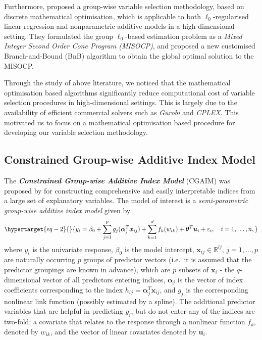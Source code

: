 \documentclass[11pt,a4paper,]{article}
\begin{document}
Furthermore, \textcite{Hazimeh2023} proposed a group-wise variable
selection methodology, based on discrete mathematical optimisation,
which is applicable to both \(\ell_{0}\)-regularised linear regression
and nonparametric additive models in a high-dimensional setting. They
formulated the group \(\ell_{0}\)-based estimation problem as a
\emph{Mixed Integer Second Order Cone Program (MISOCP)}, and proposed a
new customised Branch-and-Bound (BnB) algorithm
\autocite{Land1960,Little1963} to obtain the global optimal solution to
the MISOCP.

Through the study of above literature, we noticed that the mathematical
optimisation based algorithms significantly reduce computational cost of
variable selection procedures in high-dimensional settings. This is
largely due to the availability of efficient commercial solvers such as
\emph{Gurobi} and \emph{CPLEX}. This motivated us to focus on a
mathematical optimisation based procedure for developing our variable
selection methodology.

\hypertarget{sec-CGAIM}{%
\subsection{Constrained Group-wise Additive Index
Model}\label{sec-CGAIM}}

The \textbf{\emph{Constrained Group-wise Additive Index Model}} (CGAIM)
was proposed by \textcite{Masselot2022} for constructing comprehensive
and easily interpretable indices from a large set of explanatory
variables. The model of interest is a \emph{semi-parametric group-wise
additive index model} given by
\begin{equation}\protect\hypertarget{eq-2}{}{
  y_{i} = \beta_{0} + \sum_{j = 1}^{p}g_{j}(\bm{\alpha}_{j}^{T}\bm{x}_{ij}) + \sum_{k = 1}^{d}f_{k}(w_{ik}) + \bm{\theta}^{T}\bm{u}_{i} + \varepsilon_{i}, \quad i = 1, \dots, n,
}\label{eq-2}\end{equation} where \(y_{i}\) is the univariate response,
\(\beta_{0}\) is the model intercept,
\(\bm{x}_{ij} \in \mathbb{R}^{l{j}}\), \(j = 1, \dots, p\) are naturally
occurring \(p\) groups of predictor vectors (i.e.~it is assumed that the
predictor groupings are known in advance), which are \(p\) subsets of
\(\bm{x}_{i}\) - the \(q\)-dimensional vector of all predictors entering
indices, \(\bm{\alpha}_{j}\) is the vector of index coefficients
corresponding to the index \(h_{ij} = \bm{\alpha}_{j}^{T}\bm{x}_{ij}\),
and \(g_{j}\) is the corresponding nonlinear link function (possibly
estimated by a spline). The additional predictor variables that are
helpful in predicting \(y_{i}\), but do not enter any of the indices are
two-fold: a covariate that relates to the response through a nonlinear
function \(f_{k}\), denoted by \(w_{ik}\), and the vector of linear
covariates denoted by \(\bm{u}_{i}\).
\end{document}

